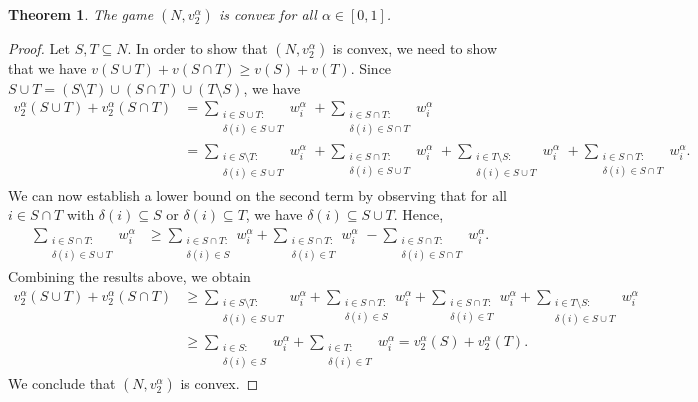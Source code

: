 \documentclass[10p]{article}
\newtheorem{theorem}{Theorem}
\theoremstyle{definition}
\theoremstyle{definition}
\begin{document}
\begin{theorem}
The game $(N,v_2^\alpha)$ is convex for all $\alpha \in [0,1]$.
\end{theorem}
\begin{proof}
Let $S, T \subseteq N$. In order to show that $(N,v_2^\alpha)$ is convex, we need to show that we have $v(S \cup T) + v(S \cap T) \geq v(S) + v(T)$. Since $S \cup T = (S \setminus T) \cup (S \cap T) \cup (T \setminus S)$, we have
\begin{align*}
    v_2^\alpha(S \cup T) + v_2^\alpha(S \cap T) & = \sum_{\substack{i \in S \cup T : \\ \delta(i) \in S \cup T}}w_i^\alpha \,\, + \sum_{\substack{i \in S \cap T : \\ \delta(i) \in S \cap T}}w_i^\alpha \\
    & = \sum_{\substack{i \in S \setminus T : \\ \delta(i) \in S \cup T}}w_i^\alpha \,\,+ \sum_{\substack{i \in S \cap T : \\ \delta(i) \in S \cup T}}w_i^\alpha \,\,  + \sum_{\substack{i \in T \setminus S : \\ \delta(i) \in S \cup T}}w_i^\alpha \, \, + \sum_{\substack{i \in S \cap T : \\ \delta(i) \in S \cap T}}w_i^\alpha.
\end{align*}
We can now establish a lower bound on the second term by observing that for all $i \in S \cap T$ with $\delta(i) \subseteq S$ or $\delta(i) \subseteq T$, we have $\delta(i) \subseteq S \cup T$. Hence,
\begin{align*}
    \sum_{\substack{i \in S \cap T : \\ \delta(i) \in S \cup T}}w_i^\alpha & \geq \sum_{\substack{i \in S \cap T : \\ \delta(i) \in S}}w_i^\alpha + \sum_{\substack{i \in S \cap T : \\ \delta(i) \in T}}w_i^\alpha \,\, - \sum_{\substack{i \in S \cap T : \\ \delta(i) \in S \cap T}}w_i^\alpha.
\end{align*}
Combining the results above, we obtain
\begin{align*}
    v_2^\alpha(S \cup T) + v_2^\alpha(S \cap T) & \geq \sum_{\substack{i \in S \setminus T : \\ \delta(i) \in S \cup T}}w_i^\alpha + \sum_{\substack{i \in S \cap T : \\ \delta(i) \in S}}w_i^\alpha  + \sum_{\substack{i \in S \cap T : \\ \delta(i) \in T}}w_i^\alpha + \sum_{\substack{i \in T \setminus S : \\ \delta(i) \in S \cup T}}w_i^\alpha \\
    & \geq \sum_{\substack{i \in S : \\ \delta(i) \in S}}w_i^\alpha + \sum_{\substack{i \in T : \\ \delta(i) \in T}}w_i^\alpha = v_2^\alpha(S) + v_2^\alpha(T).
\end{align*}
We conclude that $(N,v_2^\alpha)$ is convex. 
\end{proof}
\end{document}
